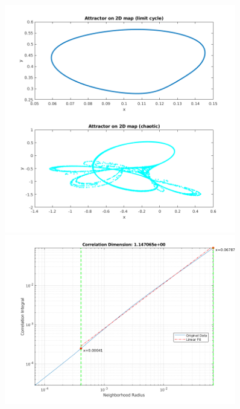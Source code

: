 \documentclass[a4paper,12pt,notitlepage]{article}
\begin{document}
\begin{figure}[h]

        \centering
        \includegraphics[width=0.9\textwidth]{Q4.png}

   

        \centering
        \includegraphics[width=0.9\textwidth]{CorDim.png}

\end{figure}
\end{document}
